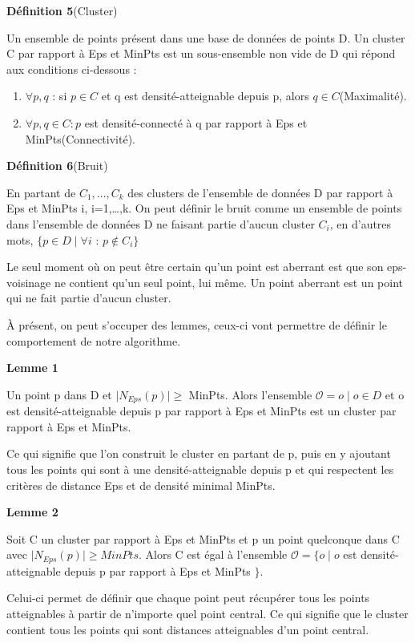 \documentclass[
  oneside]{memoire-umons}
\providecommand{\tightlist}{%
  \setlength{\itemsep}{0pt}\setlength{\parskip}{0pt}}
\begin{document}
\textbf{Définition 5}(Cluster)

Un ensemble de points présent dans une base de données de points D. Un
cluster C par rapport à Eps et MinPts est un sous-ensemble non vide de D
qui répond aux conditions ci-dessous :

\begin{enumerate}
\def\labelenumi{\arabic{enumi}.}
\tightlist
\item
  \(\forall p,q\) : si \(p \in C\) et q est densité-atteignable depuis
  p, alors \(q \in C\)(Maximalité).
\item
  \(\forall p,q \in C :p\) est densité-connecté à q par rapport à Eps et
  MinPts(Connectivité).
\end{enumerate}

\textbf{Définition 6}(Bruit)

En partant de \(C_{1}, ...,C_{k}\) des clusters de l'ensemble de données
D par rapport à Eps et MinPts i, i=1,\ldots,k. On peut définir le bruit
comme un ensemble de points dans l'ensemble de données D ne faisant
partie d'aucun cluster \(C_{i}\), en d'autres mots,
\(\{p \in D \mid \forall i\) : \(p \notin C_{i}\}\)

Le seul moment où on peut être certain qu'un point est aberrant est que
son eps-voisinage ne contient qu'un seul point, lui même. Un point
aberrant est un point qui ne fait partie d'aucun cluster.

À présent, on peut s'occuper des lemmes, ceux-ci vont permettre de
définir le comportement de notre algorithme.

\textbf{Lemme 1}

Un point p dans D et \(\mid N_{Eps}(p)\mid \geq\) MinPts. Alors
l'ensemble \(\mathcal{O} = o \mid o \in D\) et o est densité-atteignable
depuis p par rapport à Eps et MinPts est un cluster par rapport à Eps et
MinPts.

Ce qui signifie que l'on construit le cluster en partant de p, puis en y
ajoutant tous les points qui sont à une densité-atteignable depuis p et
qui respectent les critères de distance Eps et de densité minimal
MinPts.

\textbf{Lemme 2}

Soit C un cluster par rapport à Eps et MinPts et p un point quelconque
dans C avec \(\mid N_{Eps}(p)\mid \geq MinPts\). Alors C est égal à
l'ensemble \(\mathcal{O} = \{o \mid o\) est densité-atteignable depuis p
par rapport à Eps et MinPts \(\}\).

Celui-ci permet de définir que chaque point peut récupérer tous les
points atteignables à partir de n'importe quel point central. Ce qui
signifie que le cluster contient tous les points qui sont distances
atteignables d'un point central.
\end{document}
